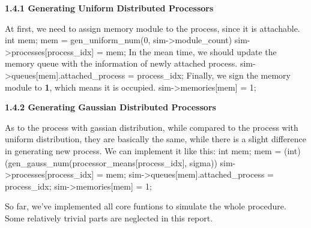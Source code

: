 \documentclass{article}%
\newenvironment{code}%
   {\snugshade\verbatim}%
   {\endverbatim\endsnugshade}
\begin{document}
\begin{Large}
\begin{flushleft}
\textbf{1.4.1 Generating Uniform Distributed Processors}
\end{flushleft}
At first, we need to assign memory module to the process, since it is attachable.
\begin{code}
    int mem;
    mem = gen_uniform_num(0, sim->module_count) %
    sim->processes[process_idx] = mem;
\end{code}
In the mean time, we should update the memory queue with the information of newly attached process.
\begin{code}
    sim->queues[mem].attached_process = process_idx;
\end{code}
Finally, we sign the memory module to \textbf{1}, which means it is occupied.
\begin{code}
    sim->memories[mem] = 1;
\end{code}
\begin{flushleft}
\textbf{1.4.2 Generating Gaussian Distributed Processors}
\end{flushleft}
As to the process with gassian distribution, while compared to the process with uniform distribution, they are basically the same, while there is a slight difference in generating new process. We can implement it like this:
\newpage
\begin{code}
    int mem;
    mem = (int) (gen_gauss_num(processor_means[process_idx], sigma)) 
    sim->processes[process_idx] = mem;
    sim->queues[mem].attached_process = process_idx;
    sim->memories[mem] = 1;    
\end{code}

So far, we've implemented all core funtions to simulate the whole procedure. Some relatively trivial parts are neglected in this report.

\end{Large}
\end{document}
